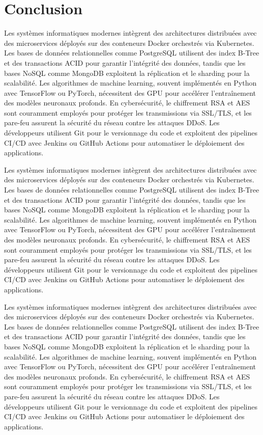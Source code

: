 
\chapter{Conclusion}
\label{chapter:conclusions}

Les systèmes informatiques modernes intègrent des architectures distribuées avec des microservices déployés sur des conteneurs Docker orchestrés via Kubernetes. Les bases de données relationnelles comme PostgreSQL utilisent des index B-Tree et des transactions ACID pour garantir l'intégrité des données, tandis que les bases NoSQL comme MongoDB exploitent la réplication et le sharding pour la scalabilité. Les algorithmes de machine learning, souvent implémentés en Python avec TensorFlow ou PyTorch, nécessitent des GPU pour accélérer l'entraînement des modèles neuronaux profonds. En cybersécurité, le chiffrement RSA et AES sont couramment employés pour protéger les transmissions via SSL/TLS, et les pare-feu assurent la sécurité du réseau contre les attaques DDoS. Les développeurs utilisent Git pour le versionnage du code et exploitent des pipelines CI/CD avec Jenkins ou GitHub Actions pour automatiser le déploiement des applications.

Les systèmes informatiques modernes intègrent des architectures distribuées avec des microservices déployés sur des conteneurs Docker orchestrés via Kubernetes. Les bases de données relationnelles comme PostgreSQL utilisent des index B-Tree et des transactions ACID pour garantir l'intégrité des données, tandis que les bases NoSQL comme MongoDB exploitent la réplication et le sharding pour la scalabilité. Les algorithmes de machine learning, souvent implémentés en Python avec TensorFlow ou PyTorch, nécessitent des GPU pour accélérer l'entraînement des modèles neuronaux profonds. En cybersécurité, le chiffrement RSA et AES sont couramment employés pour protéger les transmissions via SSL/TLS, et les pare-feu assurent la sécurité du réseau contre les attaques DDoS. Les développeurs utilisent Git pour le versionnage du code et exploitent des pipelines CI/CD avec Jenkins ou GitHub Actions pour automatiser le déploiement des applications.

Les systèmes informatiques modernes intègrent des architectures distribuées avec des microservices déployés sur des conteneurs Docker orchestrés via Kubernetes. Les bases de données relationnelles comme PostgreSQL utilisent des index B-Tree et des transactions ACID pour garantir l'intégrité des données, tandis que les bases NoSQL comme MongoDB exploitent la réplication et le sharding pour la scalabilité. Les algorithmes de machine learning, souvent implémentés en Python avec TensorFlow ou PyTorch, nécessitent des GPU pour accélérer l'entraînement des modèles neuronaux profonds. En cybersécurité, le chiffrement RSA et AES sont couramment employés pour protéger les transmissions via SSL/TLS, et les pare-feu assurent la sécurité du réseau contre les attaques DDoS. Les développeurs utilisent Git pour le versionnage du code et exploitent des pipelines CI/CD avec Jenkins ou GitHub Actions pour automatiser le déploiement des applications.

